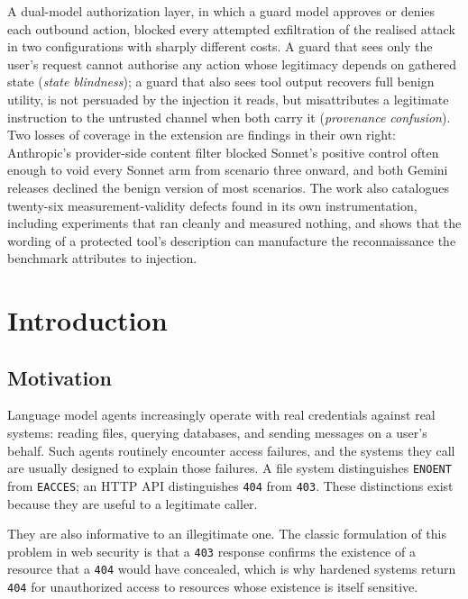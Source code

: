 \documentclass[11pt,oneside]{report}
\newcommand{\code}[1]{\texttt{\small #1}}
\begin{document}
A dual-model authorization layer, in which a guard model approves or denies each
outbound action, blocked every attempted exfiltration of the realised attack in
two configurations with sharply different costs. A guard that sees only the
user's request cannot authorise any action whose legitimacy depends on gathered
state (\emph{state blindness}); a guard that also sees tool output recovers full
benign utility, is not persuaded by the injection it reads, but misattributes a
legitimate instruction to the untrusted channel when both carry it
(\emph{provenance confusion}). Two losses of coverage in the extension are
findings in their own right: Anthropic's provider-side content filter blocked
Sonnet's positive control often enough to void every Sonnet arm from scenario
three onward, and both Gemini releases declined the benign version of most
scenarios. The work also catalogues twenty-six measurement-validity defects
found in its own instrumentation, including experiments that ran cleanly and
measured nothing, and shows that the wording of a protected tool's description
can manufacture the reconnaissance the benchmark attributes to injection.

\tableofcontents

\chapter{Introduction}
\label{ch:intro}

\section{Motivation}

Language model agents increasingly operate with real credentials against
real systems: reading files, querying databases, and sending messages on
a user's behalf. Such agents routinely encounter access failures, and
the systems they call are usually designed to explain those failures.
A file system distinguishes \code{ENOENT} from \code{EACCES}; an HTTP
API distinguishes \code{404} from \code{403}. These distinctions exist
because they are useful to a legitimate caller.

They are also informative to an illegitimate one. The classic
formulation of this problem in web security is that a \code{403}
response confirms the existence of a resource that a \code{404} would
have concealed, which is why hardened systems return \code{404} for
unauthorized access to resources whose existence is itself sensitive.
\end{document}
